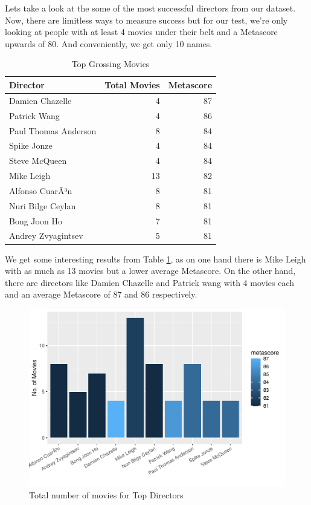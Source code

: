 \documentclass[11pt,a4paper,]{article}
\begin{document}
Lets take a look at the some of the most successful directors from our dataset. Now, there are limitless ways to measure success but for our test, we're only looking at people with at least 4 movies under their belt and a Metascore upwards of 80. And conveniently, we get only 10 names.

\begin{table}[!h]

\caption{\label{tab:dirtab}Top Grossing Movies}
\centering
\begin{tabular}[t]{l|r|r}
\hline
Director & Total Movies & Metascore\\
\hline
\rowcolor{gray!6}  Damien Chazelle & 4 & 87\\
\hline
Patrick Wang & 4 & 86\\
\hline
\rowcolor{gray!6}  Paul Thomas Anderson & 8 & 84\\
\hline
Spike Jonze & 4 & 84\\
\hline
\rowcolor{gray!6}  Steve McQueen & 4 & 84\\
\hline
Mike Leigh & 13 & 82\\
\hline
\rowcolor{gray!6}  Alfonso CuarÃ³n & 8 & 81\\
\hline
Nuri Bilge Ceylan & 8 & 81\\
\hline
\rowcolor{gray!6}  Bong Joon Ho & 7 & 81\\
\hline
Andrey Zvyagintsev & 5 & 81\\
\hline
\end{tabular}
\end{table}

We get some interesting results from Table \ref{tab:dirtab}, as on one hand there is Mike Leigh with as much as 13 movies but a lower average Metascore. On the other hand, there are directors like Damien Chazelle and Patrick wang with 4 movies each and an average Metascore of 87 and 86 respectively.

\begin{figure}
\centering
\includegraphics{Report_files/figure-latex/dirfig2-1.pdf}
\caption{\label{fig:dirfig2}Total number of movies for Top Directors}
\end{figure}
\end{document}
